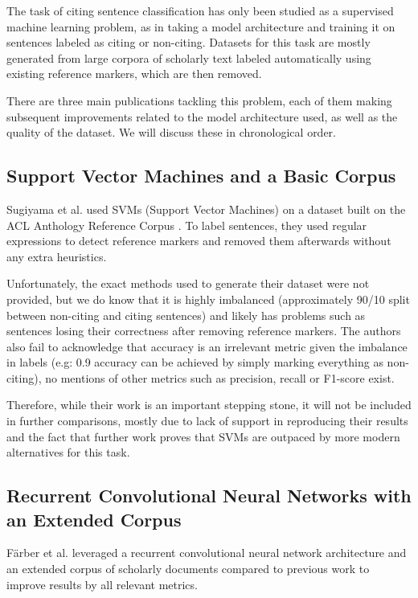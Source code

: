 \documentclass[12pt,a4paper]{report}
\begin{document}
The task of citing sentence classification has only been studied as a supervised machine learning problem, as in taking a model architecture and training it on sentences labeled as citing or non-citing. Datasets for this task are mostly generated from large corpora of scholarly text labeled automatically using existing reference markers, which are then removed.

There are three main publications tackling this problem, each of them making subsequent improvements related to the model architecture used, as well as the quality of the dataset. We will discuss these in chronological order.

\subsection{Support Vector Machines and a Basic Corpus}

Sugiyama et al. \cite{Sugiyama2010IdentifyingCS} used SVMs (Support Vector Machines) \cite{Vapni2000TheNO} on a dataset built on the ACL Anthology Reference Corpus \cite{Bird2008TheAA}. To label sentences, they used regular expressions to detect reference markers and removed them afterwards without any extra heuristics.
    
Unfortunately, the exact methods used to generate their dataset were not provided, but we do know that it is highly imbalanced (approximately 90/10 split between non-citing and citing sentences) and likely has problems such as sentences losing their correctness after removing reference markers. The authors also fail to acknowledge that accuracy is an irrelevant metric given the imbalance in labels (e.g: 0.9 accuracy can be achieved by simply marking everything as non-citing), no mentions of other metrics such as precision, recall or F1-score exist.

Therefore, while their work is an important stepping stone, it will not be included in further comparisons, mostly due to lack of support in reproducing their results and the fact that further work \cite{Frber2018ToCO} proves that SVMs \cite{Vapni2000TheNO} are outpaced by more modern alternatives for this task.

\subsection{Recurrent Convolutional Neural Networks with an Extended Corpus}

Färber et al. \cite{Frber2018ToCO} leveraged a recurrent convolutional neural network architecture and an extended corpus of scholarly documents compared to previous work to improve results by all relevant metrics.
\end{document}

